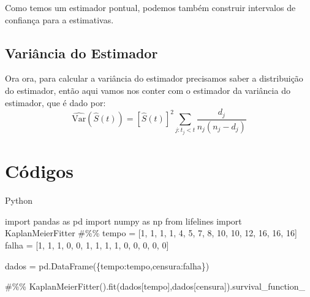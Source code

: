 \documentclass[
  letterpaper,
  DIV=11,
  numbers=noendperiod]{scrreprt}
\newenvironment{Shaded}{\begin{snugshade}}{\end{snugshade}}
\newcommand{\CommentTok}[1]{\textcolor[rgb]{0.37,0.37,0.37}{#1}}
\newcommand{\DecValTok}[1]{\textcolor[rgb]{0.68,0.00,0.00}{#1}}
\newcommand{\ImportTok}[1]{\textcolor[rgb]{0.00,0.46,0.62}{#1}}
\newcommand{\NormalTok}[1]{\textcolor[rgb]{0.00,0.46,0.62}{#1}}
\newcommand{\OperatorTok}[1]{\textcolor[rgb]{0.37,0.37,0.37}{#1}}
\newcommand{\StringTok}[1]{\textcolor[rgb]{0.13,0.47,0.30}{#1}}
\begin{document}
Como temos um estimador pontual, podemos também construir intervalos de
confiança para a estimativas.

\hypertarget{variuxe2ncia-do-estimador}{%
\subsection{Variância do Estimador}\label{variuxe2ncia-do-estimador}}

Ora ora, para calcular a variância do estimador precisamos saber a
distribuição do estimador, então aqui vamos nos conter com o estimador
da variância do estimador, que é dado por: \[
\widehat{\text{Var}}(\hat{S}(t)) = [\hat{S}(t)]^{2}\sum_{j:t_j<t}\dfrac{d_j}{n_j(n_j - d_j)} 
\]

\hypertarget{cuxf3digos}{%
\section{Códigos}\label{cuxf3digos}}

Python

\begin{Shaded}
\begin{Highlighting}[]
\ImportTok{import}\NormalTok{ pandas }\ImportTok{as}\NormalTok{ pd}
\ImportTok{import}\NormalTok{ numpy }\ImportTok{as}\NormalTok{ np}
\ImportTok{from}\NormalTok{ lifelines }\ImportTok{import}\NormalTok{ KaplanMeierFitter}
\CommentTok{\#\%\% }
\NormalTok{tempo }\OperatorTok{=}\NormalTok{ [}\DecValTok{1}\NormalTok{, }\DecValTok{1}\NormalTok{, }\DecValTok{1}\NormalTok{, }\DecValTok{1}\NormalTok{, }\DecValTok{4}\NormalTok{, }\DecValTok{5}\NormalTok{, }\DecValTok{7}\NormalTok{, }\DecValTok{8}\NormalTok{, }\DecValTok{10}\NormalTok{, }\DecValTok{10}\NormalTok{, }\DecValTok{12}\NormalTok{, }\DecValTok{16}\NormalTok{, }\DecValTok{16}\NormalTok{, }\DecValTok{16}\NormalTok{]}
\NormalTok{falha }\OperatorTok{=}\NormalTok{ [}\DecValTok{1}\NormalTok{, }\DecValTok{1}\NormalTok{, }\DecValTok{1}\NormalTok{, }\DecValTok{0}\NormalTok{, }\DecValTok{0}\NormalTok{, }\DecValTok{1}\NormalTok{, }\DecValTok{1}\NormalTok{, }\DecValTok{1}\NormalTok{, }\DecValTok{1}\NormalTok{, }\DecValTok{0}\NormalTok{, }\DecValTok{0}\NormalTok{, }\DecValTok{0}\NormalTok{, }\DecValTok{0}\NormalTok{, }\DecValTok{0}\NormalTok{]}

\NormalTok{dados }\OperatorTok{=}\NormalTok{ pd.DataFrame(\{}\StringTok{\textquotesingle{}tempo\textquotesingle{}}\NormalTok{:tempo,}\StringTok{\textquotesingle{}censura\textquotesingle{}}\NormalTok{:falha\})}

\CommentTok{\#\%\%}
\NormalTok{KaplanMeierFitter().fit(dados[}\StringTok{\textquotesingle{}tempo\textquotesingle{}}\NormalTok{],dados[}\StringTok{\textquotesingle{}censura\textquotesingle{}}\NormalTok{]).survival\_function\_}
\end{Highlighting}
\end{Shaded}
\end{document}
